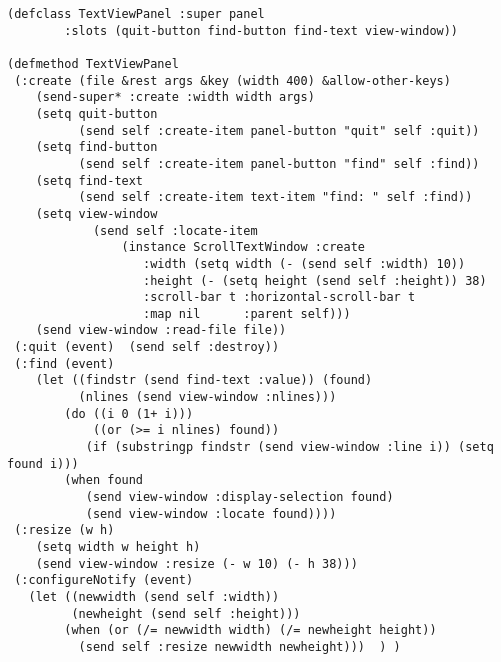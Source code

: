 \begin{verbatim}
(defclass TextViewPanel :super panel
        :slots (quit-button find-button find-text view-window))

(defmethod TextViewPanel
 (:create (file &rest args &key (width 400) &allow-other-keys)
    (send-super* :create :width width args)
    (setq quit-button
          (send self :create-item panel-button "quit" self :quit))
    (setq find-button
          (send self :create-item panel-button "find" self :find))
    (setq find-text
          (send self :create-item text-item "find: " self :find))
    (setq view-window
            (send self :locate-item
                (instance ScrollTextWindow :create
                   :width (setq width (- (send self :width) 10))
                   :height (- (setq height (send self :height)) 38)
                   :scroll-bar t :horizontal-scroll-bar t
                   :map nil      :parent self)))
    (send view-window :read-file file))
 (:quit (event)  (send self :destroy))
 (:find (event)
    (let ((findstr (send find-text :value)) (found)
          (nlines (send view-window :nlines)))
        (do ((i 0 (1+ i)))
            ((or (>= i nlines) found))
           (if (substringp findstr (send view-window :line i)) (setq found i)))
        (when found
           (send view-window :display-selection found)
           (send view-window :locate found))))
 (:resize (w h)
    (setq width w height h)
    (send view-window :resize (- w 10) (- h 38)))
 (:configureNotify (event)
   (let ((newwidth (send self :width))
         (newheight (send self :height)))
        (when (or (/= newwidth width) (/= newheight height))
          (send self :resize newwidth newheight)))  ) )
\end{verbatim}

